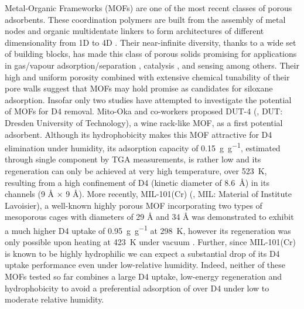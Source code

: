 Metal-Organic Frameworks (MOFs) are one of the most recent classes of porous
adsorbents. These coordination polymers are built from the assembly of metal
nodes and organic multidentate linkers to form architectures of different
dimensionality from 1D to 4D \citep{fereyHybridPorousSolids2008,
zhouIntroductionMetalOrganic2012,
evansFourdimensionalMetalorganicFrameworks2020}. Their near-infinite diversity,
thanks to a wide set of building blocks, has made this class of porous solids
promising for applications in gas/vapour adsorption/separation
\citep{siegelmanChallengesOpportunitiesAdsorptionbased2019,
linMicroporousMetalOrganicFramework2020}, catalysis
\citep{bavykinaMetalOrganicFrameworks2020}, and sensing
\citep{allendorfElectronicDevicesUsing2020,
woellnerAdsorptionDetectionHazardous2018} among others. Their high and uniform
porosity combined with extensive chemical tunability of their pore walls suggest
that MOFs may hold promise as candidates for siloxane adsorption. Insofar only
two studies have attempted to investigate the potential of MOFs for D4 removal.
Mito-Oka and co-workers \citep{mito-okaSiloxaneD4Capture2013} proposed DUT-4
(\ce{[Al(OH)(2,6-ndc)}, DUT: Dresden University of Technology), a wine rack-like
MOF, as a first potential adsorbent. Although its hydrophobicity makes this MOF
attractive for D4 elimination under humidity, its adsorption capacity of
\SI{0.15}{\gram\per\gram}, estimated through single component by TGA
measurements, is rather low and its regeneration can only be achieved at very
high temperature, over \SI{523}{\kelvin}, resulting from a high confinement of
D4 (kinetic diameter of \SI{8.6}{\angstrom}) in its channels (9 Å × 9 Å). More
recently, MIL-101(Cr) (, MIL: Material of Institute
Lavoisier), a well-known highly porous MOF incorporating two types of mesoporous
cages with diameters of 29 Å and 34 Å was demonstrated to exhibit a much higher
D4 uptake of \SI{0.95}{\gram\per\gram} at \SI{298}{\kelvin}, however its
regeneration was only possible upon heating at \SI{423}{\kelvin} under vacuum
\citep{gargiuloChromiumbasedMIL101Metal2019}. Further, since MIL-101(Cr) is
known to be highly hydrophilic \citep{zhaoSynthesisMIL101Cr2020} we can expect a
substantial drop of its D4 uptake performance even under low-relative humidity.
Indeed, neither of these MOFs tested so far combines a large D4 uptake,
low-energy regeneration and hydrophobicity to avoid a preferential adsorption of
 over D4 under low to moderate relative humidity.

